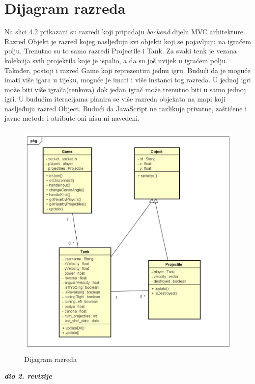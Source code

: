 			\eject
			
			
		\section{Dijagram razreda}
		
		Na slici 4.2 prikazani su razredi koji pripadaju \textit{backend} dijelu MVC arhitekture. Razred Objekt je razred kojeg nasljeđuju svi objekti koji se pojavljuju na igraćem polju. Trenutno su to samo razredi Projectile i Tank. Za svaki tenk je vezana kolekcija svih projektila koje je ispalio, a da su još uvijek u igraćem polju. Također, postoji i razred Game koji reprezentira jednu igru. Budući da je moguće imati više igara u tijeku, moguće je imati i više instanci tog razreda. U jednoj igri može biti više igrača(tenkova) dok jedan igrač može trenutno biti u samo jednoj igri. U budućim iteracijama planira se više razreda objekata na mapi koji nasljeđuju razred Object. Budući da JavaScript ne razlikuje privatne, zaštićene i javne metode i atribute oni nisu ni navedeni.
			
			\begin{figure}[h]
				\centering
				\includegraphics[width=16cm,height=12cm]{classDiagram}
				\caption{Dijagram razreda}
				\label{fig:uc}
			\end{figure}
			
			
			\newpage
			\textbf{\textit{dio 2. revizije}}\\			
			
